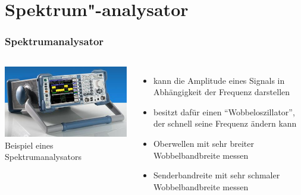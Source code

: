 \section*{Spektrum"-analysator}
\begin{frame}
  \frametitle{Spektrumanalysator}
  \begin{columns}
    \begin{center}
      \includegraphics[width=\textwidth,height=.8\textheight,keepaspectratio]{a16/Spektrumanalysator.jpg}\\
      {\tiny Beispiel eines Spektrumanalysators \href{refs}{\cite{wp}}}
    \end{center}
    \begin{itemize}
      \item kann die Amplitude eines Signals in Abhängigkeit der Frequenz darstellen
      \item besitzt dafür einen ``Wobbeloszillator'', der schnell seine Frequenz ändern kann
      \item Oberwellen mit sehr breiter Wobbelbandbreite messen
      \item Senderbandreite mit sehr schmaler Wobbelbandbreite messen
    \end{itemize}
  \end{columns}
\end{frame}

